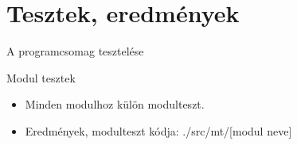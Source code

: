 \documentclass{beamer}
\begin{document}
\section{Tesztek, eredmények}
\label{tab:results}

\begin{frame}{A programcsomag tesztelése}
\linespread{0.8}
\small
\vspace{-2mm}
\begin{block}{Modul tesztek}
	\begin{itemize}
		\item Minden modulhoz külön modulteszt.
		\item Eredmények, modulteszt kódja: ./src/mt/[modul neve]
	\end{itemize}
	\end{block}		
\end{frame}
\end{document}
